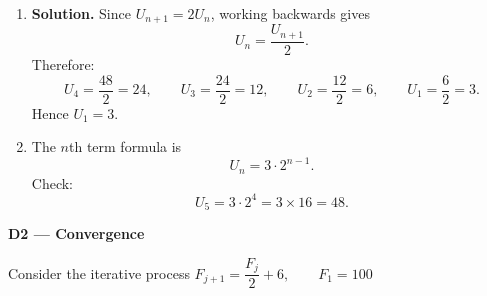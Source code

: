 \documentclass[12pt,a4paper]{article}
\begin{document}
\begin{enumerate}
  \item \textbf{Solution.} Since \(U_{n+1} = 2U_n\), working backwards gives
  \[
    U_n = \frac{U_{n+1}}{2}.
  \]
  Therefore:
  \[
    U_4 = \frac{48}{2} = 24, \qquad
    U_3 = \frac{24}{2} = 12, \qquad
    U_2 = \frac{12}{2} = 6, \qquad
    U_1 = \frac{6}{2} = 3.
  \]
  Hence \(U_1 = 3\).

  \item The $n$th term formula is
  \[
    U_n = 3 \cdot 2^{n-1}.
  \]
  Check:
  \[
    U_5 = 3 \cdot 2^{4} = 3 \times 16 = 48.
  \]

\end{enumerate}

\bigskip\bigskip

\newpage{}

\noindent\textbf{D2 --- Convergence}

\begin{tcolorbox}[colback=white, colframe=lightgrey, sharp corners, left=8pt, top=6pt, bottom=6pt]
Consider the iterative process \quad $F_{j+1} = \dfrac{F_j}{2} + 6, \qquad F_1 = 100$
\end{tcolorbox}
\end{document}
